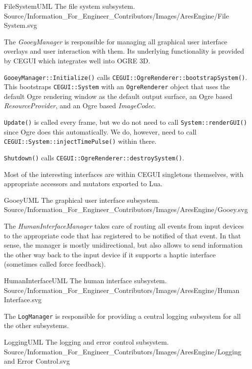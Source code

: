 \FullPageLandscapeDiagram
    {FileSystemUML}
    {The file system subsystem.}
    {Source/Information_For_Engineer_Contributors/Images/AresEngine/File System.svg}

\page 
{}
The {\it GooeyManager} is responsible for managing all graphical user interface overlays and user interaction with them. Its underlying functionality is provided by CEGUI which integrates well into OGRE 3D.

{\tt GooeyManager::Initialize()} calls {\tt CEGUI::OgreRenderer::bootstrapSystem()}. This bootstraps {\tt CEGUI::System} with an {\tt OgreRenderer} object that uses the default Ogre rendering window as the default output surface, an Ogre based {\it ResourceProvider}, and an Ogre based {\it ImageCodec}.

{\tt Update()} is called every frame, but we do not need to call {\tt System::renderGUI()} since Ogre does this automatically. We do, however, need to call {\tt CEGUI::System::injectTimePulse()} within there.

{\tt Shutdown()} calls {\tt CEGUI::OgreRenderer::destroySystem()}.

Most of the interesting interfaces are within CEGUI singletons themselves, with appropriate accessors and mutators exported to Lua.

\FullPageLandscapeDiagram
    {GooeyUML}
    {The graphical user interface subsystem.}
    {Source/Information_For_Engineer_Contributors/Images/AresEngine/Gooey.svg}

\page 
{}
The {\it HumanInterfaceManager} takes care of routing all events from input devices to the appropriate code that has registered to be notified of that event. In that sense, the manager is mostly unidirectional, but also allows to send information the other way back to the input device if it supports a haptic interface (sometimes called force feedback).

\FullPageLandscapeDiagram
    {HumanInterfaceUML}
    {The human interface subsystem.}
    {Source/Information_For_Engineer_Contributors/Images/AresEngine/Human Interface.svg}

\page 
{}
The {\tt LogManager} is responsible for providing a central logging subsystem for all the other subsystems.

\FullPageLandscapeDiagram
    {LoggingUML}
    {The logging and error control subsystem.}
    {Source/Information_For_Engineer_Contributors/Images/AresEngine/Logging and Error Control.svg}
    
